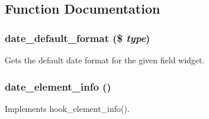 \subsection{Function Documentation}
\hypertarget{date_8module_a02c7a9a9c79c730064240ea129f062fc}{
\subsubsection[{date\_\-default\_\-format}]{\setlength{\rightskip}{0pt plus 5cm}date\_\-default\_\-format (\$ {\em type})}}
\label{date_8module_a02c7a9a9c79c730064240ea129f062fc}
Gets the default date format for the given field widget. \hypertarget{date_8module_a9e7c70efb10524fbd6c19512b08e697b}{
\subsubsection[{date\_\-element\_\-info}]{\setlength{\rightskip}{0pt plus 5cm}date\_\-element\_\-info ()}}
\label{date_8module_a9e7c70efb10524fbd6c19512b08e697b}
Implements hook\_\-element\_\-info().

